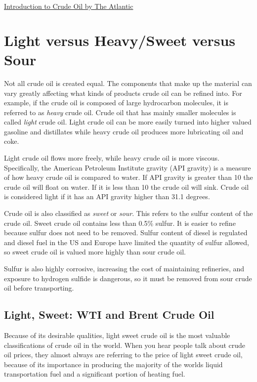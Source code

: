 \documentclass[
]{book}
\begin{document}
\href{https://www.youtube.com/watch?v=62LvVYYqUFA}{Introduction to Crude Oil by The Atlantic}

\hypertarget{light-versus-heavysweet-versus-sour}{%
\section{Light versus Heavy/Sweet versus Sour}\label{light-versus-heavysweet-versus-sour}}

Not all crude oil is created equal. The components that make up the material can vary greatly affecting what kinds of products crude oil can be refined into. For example, if the crude oil is composed of large hydrocarbon molecules, it is referred to as \emph{heavy} crude oil. Crude oil that has mainly smaller molecules is called \emph{light} crude oil. Light crude oil can be more easily turned into higher valued gasoline and distillates while heavy crude oil produces more lubricating oil and coke.

Light crude oil flows more freely, while heavy crude oil is more viscous. Specifically, the American Petroleum Institute gravity (API gravity) is a measure of how heavy crude oil is compared to water. If API gravity is greater than 10 the crude oil will float on water. If it is less than 10 the crude oil will sink. Crude oil is considered light if it has an API gravity higher than 31.1 degrees.

Crude oil is also classified as \emph{sweet} or \emph{sour}. This refers to the sulfur content of the crude oil. Sweet crude oil contains less than 0.5\% sulfur. It is easier to refine because sulfur does not need to be removed. Sulfur content of diesel is regulated and diesel fuel in the US and Europe have limited the quantity of sulfur allowed, so sweet crude oil is valued more highly than sour crude oil.

Sulfur is also highly corrosive, increasing the cost of maintaining refineries, and exposure to hydrogen sulfide is dangerous, so it must be removed from sour crude oil before transporting.

\hypertarget{light-sweet-wti-and-brent-crude-oil}{%
\subsection{Light, Sweet: WTI and Brent Crude Oil}\label{light-sweet-wti-and-brent-crude-oil}}

Because of its desirable qualities, light sweet crude oil is the most valuable classifications of crude oil in the world. When you hear people talk about crude oil prices, they almost always are referring to the price of light sweet crude oil, because of its importance in producing the majority of the worlds liquid transportation fuel and a significant portion of heating fuel.
\end{document}
